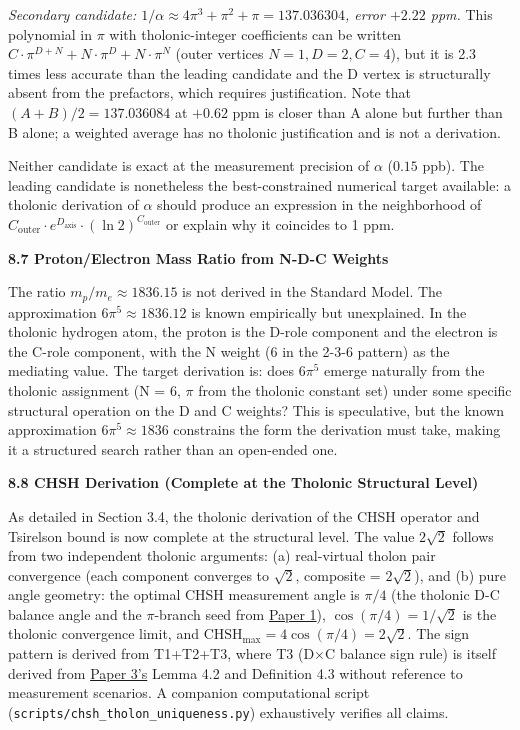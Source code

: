 \documentclass[
  11pt,
  letterpaper,
]{article}
\begin{document}
\emph{Secondary candidate:
\(1/\alpha \approx 4\pi^3 + \pi^2 + \pi = 137.036304\), error \(+2.22\)
ppm.} This polynomial in \(\pi\) with tholonic-integer coefficients can
be written \(C \cdot \pi^{D+N} + N \cdot \pi^D + N \cdot \pi^N\) (outer
vertices \(N=1, D=2, C=4\)), but it is 2.3 times less accurate than the
leading candidate and the D vertex is structurally absent from the
prefactors, which requires justification. Note that
\((A + B)/2 = 137.036084\) at \(+0.62\) ppm is closer than A alone but
further than B alone; a weighted average has no tholonic justification
and is not a derivation.

Neither candidate is exact at the measurement precision of \(\alpha\)
(\(0.15\) ppb). The leading candidate is nonetheless the
best-constrained numerical target available: a tholonic derivation of
\(\alpha\) should produce an expression in the neighborhood of
\(C_\text{outer} \cdot e^{D_\text{axis}} \cdot (\ln 2)^{C_\text{outer}}\)
or explain why it coincides to 1 ppm.

\textbf{8.7 Proton/Electron Mass Ratio from N-D-C Weights}

The ratio \(m_p/m_e \approx 1836.15\) is not derived in the Standard
Model. The approximation \(6\pi^5 \approx 1836.12\) is known empirically
but unexplained. In the tholonic hydrogen atom, the proton is the D-role
component and the electron is the C-role component, with the N weight (6
in the 2-3-6 pattern) as the mediating value. The target derivation is:
does \(6\pi^5\) emerge naturally from the tholonic assignment (N = 6,
\(\pi\) from the tholonic constant set) under some specific structural
operation on the D and C weights? This is speculative, but the known
approximation \(6\pi^5 \approx 1836\) constrains the form the derivation
must take, making it a structured search rather than an open-ended one.

\textbf{8.8 CHSH Derivation (Complete at the Tholonic Structural Level)}

As detailed in Section 3.4, the tholonic derivation of the CHSH operator
and Tsirelson bound is now complete at the structural level. The value
\(2\sqrt{2}\) follows from two independent tholonic arguments: (a)
real-virtual tholon pair convergence (each component converges to
\(\sqrt{2}\), composite = \(2\sqrt{2}\)), and (b) pure angle geometry:
the optimal CHSH measurement angle is \(\pi/4\) (the tholonic D-C
balance angle and the \(\pi\)-branch seed from
\href{https://github.com/baardev/truevalue/blob/main/docnav/Research/papers/1_recursive-tholonic-five-constants/1_recursive-tholonic-five-constants.pdf}{Paper
1}), \(\cos(\pi/4) = 1/\sqrt{2}\) is the tholonic convergence limit, and
\(\mathrm{CHSH}_{\max} = 4\cos(\pi/4) = 2\sqrt{2}\). The sign pattern is
derived from T1+T2+T3, where T3 (D\(\times\)C balance sign rule) is
itself derived from
\href{https://github.com/baardev/truevalue/blob/main/docnav/Research/papers/3_minimal-recursive-triadic-framework/3_minimal-recursive-triadic-framework.pdf}{Paper
3's} Lemma 4.2 and Definition 4.3 without reference to measurement
scenarios. A companion computational script
(\texttt{scripts/chsh\_tholon\_uniqueness.py}) exhaustively verifies all
claims.
\end{document}
